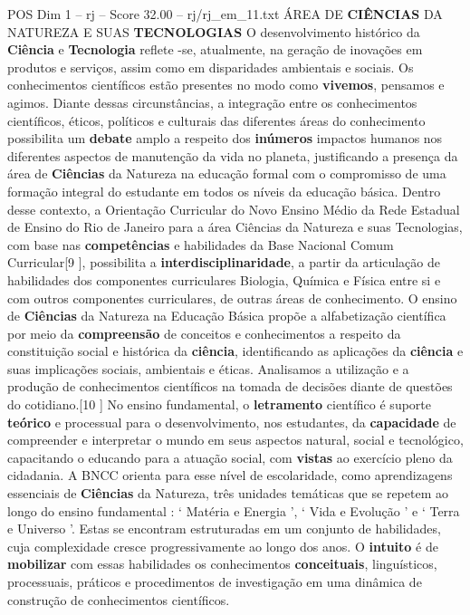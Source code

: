 \begin{textsample}{POS Dim 1 – rj – Score 32.00 – rj/rj\_em\_11.txt}  \label{ex:f1_pos_278}
ÁREA DE \textbf{CIÊNCIAS} DA NATUREZA E SUAS \textbf{TECNOLOGIAS} O desenvolvimento histórico da \textbf{Ciência} e \textbf{Tecnologia} reflete -se, atualmente, na geração de inovações em produtos e serviços, assim como em disparidades ambientais e sociais.
Os conhecimentos científicos estão presentes no modo como \textbf{vivemos}, pensamos e agimos.
Diante dessas circunstâncias, a integração entre os conhecimentos científicos, éticos, políticos e culturais das diferentes áreas do conhecimento possibilita um \textbf{debate} amplo a respeito dos \textbf{inúmeros} impactos humanos nos diferentes aspectos de manutenção da vida no planeta, justificando a presença da área de \textbf{Ciências} da Natureza na educação formal com o compromisso de uma formação integral do estudante em todos os níveis da educação básica.
Dentro desse contexto, a Orientação Curricular do Novo Ensino Médio da Rede Estadual de Ensino do Rio de Janeiro para a área Ciências da Natureza e suas Tecnologias, com base nas \textbf{competências} e habilidades da Base Nacional Comum Curricular[9 ], possibilita a \textbf{interdisciplinaridade}, a partir da articulação de habilidades dos componentes curriculares Biologia, Química e Física entre si e com outros componentes curriculares, de outras áreas de conhecimento.
O ensino de \textbf{Ciências} da Natureza na Educação Básica propõe a alfabetização científica por meio da \textbf{compreensão} de conceitos e conhecimentos a respeito da constituição social e histórica da \textbf{ciência}, identificando as aplicações da \textbf{ciência} e suas implicações sociais, ambientais e éticas.
Analisamos a utilização e a produção de conhecimentos científicos na tomada de decisões diante de questões do cotidiano.[10 ] No ensino fundamental, o \textbf{letramento} científico é suporte \textbf{teórico} e processual para o desenvolvimento, nos estudantes, da \textbf{capacidade} de compreender e interpretar o mundo em seus aspectos natural, social e tecnológico, capacitando o educando para a atuação social, com \textbf{vistas} ao exercício pleno da cidadania.
A BNCC orienta para esse nível de escolaridade, como aprendizagens essenciais de \textbf{Ciências} da Natureza, três unidades temáticas que se repetem ao longo do ensino fundamental : ‘ Matéria e Energia ’, ‘ Vida e Evolução ’ e ‘ Terra e Universo ’.
Estas se encontram estruturadas em um conjunto de habilidades, cuja complexidade cresce progressivamente ao longo dos anos.
O \textbf{intuito} é de \textbf{mobilizar} com essas habilidades os conhecimentos \textbf{conceituais}, linguísticos, processuais, práticos e procedimentos de investigação em uma dinâmica de construção de conhecimentos científicos.

\end{textsample}
